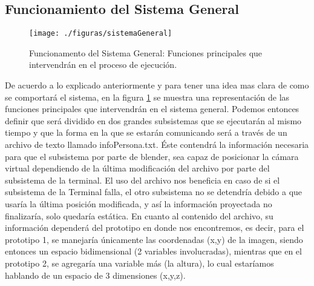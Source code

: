 \documentclass[a4paper,openright,12pt]{report}
\begin{document}
\subsection{Funcionamiento del Sistema General}
\begin{figure}[th]
	\centering
	\texttt{[image: ./figuras/sistemaGeneral]}
	\caption[Funcionamento del Sistema General]{Funcionamento del Sistema General: Funciones principales que intervendrán en el proceso de ejecución.} \label{fig:sistemaGeneral}
\end{figure}
De acuerdo a lo explicado anteriormente y para tener una idea mas clara de como se comportará el sistema, en la figura \ref{fig:sistemaGeneral} se muestra una representación de las funciones principales que intervendrán en el sistema general. Podemos entonces definir que será dividido en dos grandes subsistemas que se ejecutarán al mismo tiempo y que la forma en la que se estarán comunicando será a través de un archivo de texto llamado infoPersona.txt. Éste contendrá la información necesaria para que el subsistema por parte de blender, sea capaz de posicionar la cámara virtual dependiendo de la última modificación del archivo por parte del subsistema de la terminal. El uso del archivo nos beneficia en caso de si el subsistema de la Terminal falla, el otro subsistema no se detendría debido a que usaría la última posición modificada, y así la información proyectada no finalizaría, solo quedaría estática. En cuanto al contenido del archivo, su información dependerá del prototipo en donde nos encontremos, es decir, para el prototipo 1, se manejaría únicamente las coordenadas (x,y) de la imagen, siendo entonces un espacio bidimensional (2 variables involucradas), mientras que en el prototipo 2, se agregaría una variable más (la altura), lo cual estaríamos hablando de un espacio de 3 dimensiones (x,y,z).

\end{document}
